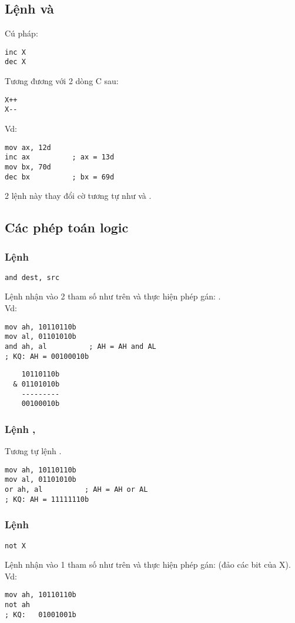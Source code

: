 \documentclass[main.tex]{subfiles}
\begin{document}
\subsection{Lệnh  và }
Cú pháp:
\begin{verbatim}
inc X
dec X
\end{verbatim}
Tương đương với 2 dòng C sau:
\begin{verbatim}
X++
X--
\end{verbatim}
Vd:
\begin{verbatim}
mov ax, 12d 
inc ax          ; ax = 13d
mov bx, 70d     
dec bx          ; bx = 69d
\end{verbatim}
2 lệnh này thay đổi cờ tương tự như  và .

\subsection{Các phép toán logic}
\subsubsection{Lệnh }
\begin{verbatim}
and dest, src
\end{verbatim}
Lệnh  nhận vào 2 tham số như trên và thực hiện phép gán: .\\
Vd:
\begin{verbatim}
mov ah, 10110110b
mov al, 01101010b
and ah, al          ; AH = AH and AL 
; KQ: AH = 00100010b
\end{verbatim}
\begin{verbatim}
    10110110b
  & 01101010b
    ---------
    00100010b
\end{verbatim}

\subsubsection{Lệnh , }
Tương tự lệnh .
\begin{verbatim}
mov ah, 10110110b
mov al, 01101010b
or ah, al          ; AH = AH or AL 
; KQ: AH = 11111110b
\end{verbatim}

\subsubsection{Lệnh }
\begin{verbatim}
not X
\end{verbatim}
Lệnh  nhận vào 1 tham số như trên và thực hiện phép gán:  (đảo các bit của \cd X).
Vd:
\begin{verbatim}
mov ah, 10110110b
not ah
; KQ:   01001001b
\end{verbatim}
\end{document}
